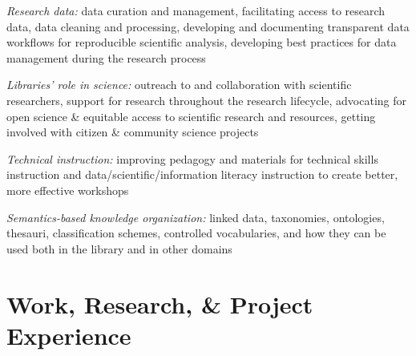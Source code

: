 \documentclass[12pt,letterpaper]{report}
\newcommand{\listitemspace}{0.25em}
\renewenvironment{itemize}
{\begin{list}{}{\setlength{\leftmargin}{0em}
            \setlength{\parskip}{0em}
            \setlength{\itemsep}{\listitemspace}
            \setlength{\parsep}{\listitemspace}}}
{\end{list}}
\begin{document}
\begin{itemize}

	\item \textit{Research data:} data curation and management, facilitating access to research data, data cleaning and processing, developing and documenting transparent data workflows for reproducible scientific analysis, developing best practices for data management during the research process

	\item \textit{Libraries' role in science:} outreach to and collaboration with scientific researchers, support for research throughout the research lifecycle, advocating for open science \& equitable access to scientific research and resources, getting involved with citizen \& community science projects

	\item \textit{Technical instruction:} improving pedagogy and materials for technical skills instruction and data/scientific/information literacy instruction to create better, more effective workshops

	\item \textit{Semantics-based knowledge organization:} linked data, taxonomies, ontologies, thesauri, classification schemes, controlled vocabularies, and how they can be used both in the library and in other domains

\end{itemize}



\section*{Work, Research, \& Project Experience}
\end{document}
